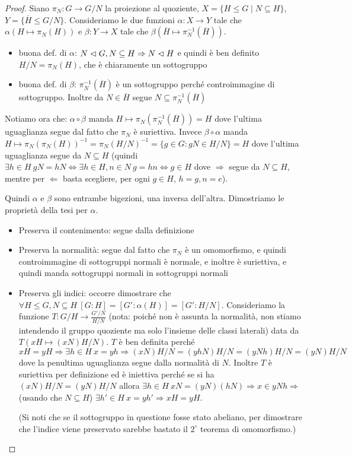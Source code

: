 \begin{proof}
    Siano $\pi_N: G \rightarrow G/N$ la proiezione al quoziente, $X  = \{ H \leq G \mid N \subseteq H \}$, $Y = \{ \overline H \leq G/N \}$. Consideriamo le due funzioni $\alpha: X \rightarrow Y$ tale che $\alpha(H \mapsto \pi_N(H))$ e $\beta: Y \rightarrow X$ tale che $\beta( \overline H \mapsto \pi_N^{-1}(\overline H) )$. 
    \begin{itemize}
        \item buona def. di $\alpha$: $N \vartriangleleft G, N \subseteq H \Rightarrow N \vartriangleleft H$ e quindi è ben definito $H/N = \pi_N(H)$, che è chiaramente un sottogruppo
        \item buona def. di $\beta$: $\pi_N^{-1}(\overline H)$ è un sottogruppo perché controimmagine di sottogruppo. Inoltre da $N \in \overline H$ segue $N \subseteq \pi_N^{-1}(\overline H)$
    \end{itemize}
    Notiamo ora che: $\alpha \circ \beta$ manda $H \mapsto  \pi_N(\pi_N^{-1}(\overline H)) = H$ dove l'ultima uguaglianza segue dal fatto che $\pi_N$ è suriettiva. Invece $ \beta \circ \alpha$ manda 
    $H \mapsto  \pi_N(\pi_N(H))^{-1} = \pi_N(H/N)^{-1} = \{g \in G : gN \in H/N \} =  H$
    dove l'ultima uguaglianza segue da $N \subseteq H$ (quindi $\exists h \in H \ gN = hN \iff \exists h \in H, n \in N \  g = hn \iff g \in H$ dove $\Rightarrow$ segue da $N \subseteq H$, mentre per $\Leftarrow$ basta scegliere, per ogni $g \in H$, $h = g, n = e$).
    
    Quindi $\alpha$ e $\beta$ sono entrambe bigezioni, una inversa dell'altra. Dimostriamo le proprietà della tesi per $\alpha$.
    \begin{itemize}
        \item Preserva il contenimento: segue dalla definizione
        \item Preserva la normalità: segue dal fatto che $\pi_N$ è un omomorfismo, e quindi controimmagine di sottogruppi normali è normale, e inoltre è suriettiva, e quindi manda sottogruppi normali in sottogruppi normali
        \item Preserva gli indici:  occorre dimostrare che $\forall H \leq G , N \subseteq H \ [G:H] = [G' : \alpha(H)] = [G' : H/N]$. Consideriamo la funzione $T: G/H \rightarrow \frac{G'/N}{H/N}$ (nota: poiché non è assunta la normalità, non stiamo intendendo il gruppo quoziente ma solo l'insieme delle classi laterali) data da $T(xH \mapsto (xN)H/N)$. $T$ è ben definita perché $xH = yH \Rightarrow \exists h \in H \ x = yh \Rightarrow (xN)H/N = (yhN)H/N = (yNh)H/N = (yN)H/N$ dove la penultima uguaglianza segue dalla normalità di $N$. Inoltre $T$ è suriettiva per definizione ed è iniettiva perché se si ha $(xN)H/N = (yN)H/N$ allora $\exists h \in H \ xN = (yN) (hN) \Rightarrow x \in yNh \Rightarrow$ (usando che $N\subseteq H$) $\exists h' \in H \ x = yh' \Rightarrow xH = yH$.
        
        (Si noti che se il sottogruppo in questione fosse stato abeliano, per dimostrare che l'indice viene preservato sarebbe bastato il $2^{\circ}$ teorema di omomorfismo.)
    \end{itemize}
\end{proof}
